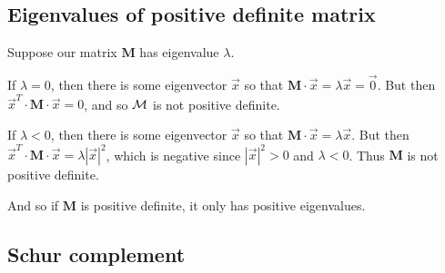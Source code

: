 \subsection{Eigenvalues of positive definite matrix}

Suppose our matrix ${\bm M}$ has eigenvalue $\lambda$.

If $\lambda=0$, then there is some eigenvector $\vec{x}$ so that 
${\bm M}\cdot\vec{x}=\lambda \vec{x}=\vec{0}$. 
But then $\vec{x}^T \cdot {\bm M} \cdot \vec{x}=0$, and so ${\cal M}$ is not positive definite.

If $\lambda<0$, then there is some eigenvector $\vec{x}$ 
so that ${\bm M}\cdot\vec{x}=\lambda \vec{x}$. 
But then $\vec{x}^T \cdot {\bm M} \cdot \vec{x}=\lambda |\vec{x}|^2$, 
which is negative since $|\vec{x}|^2>0$ and $\lambda<0$. Thus ${\bm M}$ is not positive definite.

And so if ${\bm M}$ is positive definite, it only has positive eigenvalues.

\subsection{Schur complement}

